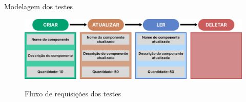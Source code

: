 \documentclass{libs/ufc_format}
\begin{document}

\begin{frame}{Modelagem dos testes}
    \begin{figure}[H]
        \centering
        \caption{Fluxo de requisições dos testes}
        \includegraphics[width=1\linewidth]{figuras/fluxo-requisicoes-testes.pdf}
        \captionsetup{justification=centering}
        \label{fig:fluxo-requisicoes-testes}
    \end{figure}
\end{frame}


\end{document}
